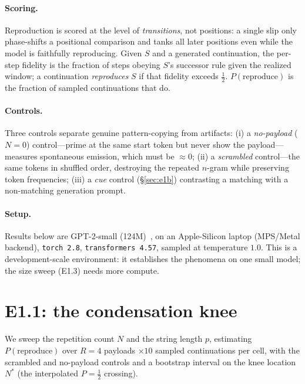 \documentclass[11pt]{article}
\theoremstyle{plain}
\theoremstyle{definition}
\theoremstyle{remark}
\begin{document}
\paragraph{Scoring.} Reproduction is scored at the level of \emph{transitions}, not
positions: a single slip only phase-shifts a positional comparison and tanks all later
positions even while the model is faithfully reproducing. Given $S$ and a generated
continuation, the per-step fidelity is the fraction of steps obeying $S$'s successor rule
given the realized window; a continuation \emph{reproduces} $S$ if that fidelity exceeds
$\tfrac12$. $P(\text{reproduce})$ is the fraction of sampled continuations that do.

\paragraph{Controls.} Three controls separate genuine pattern-copying from artifacts:
(i) a \emph{no-payload} ($N{=}0$) control---prime at the same start token but never show
the payload---measures spontaneous emission, which must be $\approx 0$; (ii) a
\emph{scrambled} control---the same tokens in shuffled order, destroying the repeated
$n$-gram while preserving token frequencies; (iii) a \emph{cue} control (\S\ref{sec:e1b})
contrasting a matching with a non-matching generation prompt.

\paragraph{Setup.} Results below are GPT-2-small (124M)~\cite{radford2019}, on an Apple-Silicon
laptop (MPS/Metal backend), \texttt{torch~2.8}, \texttt{transformers~4.57}, sampled at
temperature $1.0$. This is a development-scale environment: it establishes the phenomena on
one small model; the size sweep (E1.3) needs more compute.

\section{E1.1: the condensation knee}\label{sec:e1}
We sweep the repetition count $N$ and the string length $p$, estimating
$P(\text{reproduce})$ over $R{=}4$ payloads $\times 10$ sampled continuations per cell, with
the scrambled and no-payload controls and a bootstrap interval on the knee location $N^*$
(the interpolated $P{=}\tfrac12$ crossing).
\end{document}
